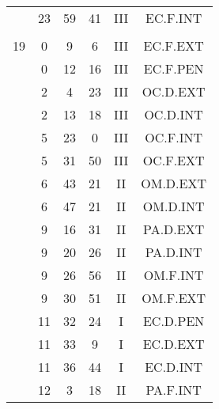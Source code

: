 \documentclass[12pt, a4paper]{article}
\begin{document}
\begin{multicols}{3}
{\begin{tabular}{c c c c c c}
	 	 	 	 & 23 & 59 & 41 & III & EC.F.INT\\%
	 	 	 	 & & & & & \\%
	 	 	 	19 & 0 & 9 & 6 & III & EC.F.EXT\\%
	 	 	 	 & 0 & 12 & 16 & III & EC.F.PEN\\%
	 	 	 	 & 2 & 4 & 23 & III & OC.D.EXT\\%
	 	 	 	 & 2 & 13 & 18 & III & OC.D.INT\\%
	 	 	 	 & 5 & 23 & 0 & III & OC.F.INT\\%
	 	 	 	 & 5 & 31 & 50 & III & OC.F.EXT\\%
	 	 	 	 & 6 & 43 & 21 & II & OM.D.EXT\\%
	 	 	 	 & 6 & 47 & 21 & II & OM.D.INT\\%
	 	 	 	 & 9 & 16 & 31 & II & PA.D.EXT\\%
	 	 	 	 & 9 & 20 & 26 & II & PA.D.INT\\%
	 	 	 	 & 9 & 26 & 56 & II & OM.F.INT\\%
	 	 	 	 & 9 & 30 & 51 & II & OM.F.EXT\\%
	 	 	 	 & 11 & 32 & 24 & I & EC.D.PEN\\%
	 	 	 	 & 11 & 33 & 9 & I & EC.D.EXT\\%
	 	 	 	 & 11 & 36 & 44 & I & EC.D.INT\\%
	 	 	 	 & 12 & 3 & 18 & II & PA.F.INT\\%
	 	 \end{tabular}
 	}
\end{multicols}
\end{document}
